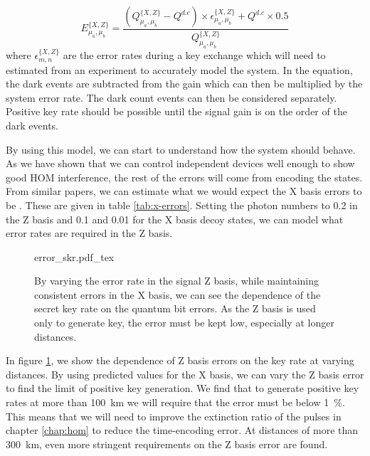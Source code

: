\begin{equation}
	E^{\{X,Z\}}_{\mu_a,\mu_b} = \frac{\left(Q^{\{X,Z\}}_{\mu_a,\mu_b} - Q^{d.c}\right) \times \epsilon^{\{X,Z\}}_{\mu_a,\mu_b} + Q^{d.c} \times 0.5}{Q^{\{X,Z\}}_{\mu_a,\mu_b}}
\end{equation}
where $\epsilon^{\{X,Z\}}_{m,n}$ are the error rates during a key exchange which will need to estimated from an experiment to accurately model the system. In the equation, the dark events are subtracted from the gain which can then be multiplied by the system error rate. The dark count events can then be considered separately. Positive key rate should be possible until the signal gain is on the order of the dark events.

By using this model, we can start to understand how the system should behave. As we have shown that we can control independent devices well enough to show good \ac{HOM} interference, the rest of the errors will come from encoding the states. From similar papers, we can estimate what we would expect the X basis errors to be \cite{Rubenok2013, Comandar2016}. These are given in table \ref{tab:x-errors}. Setting the photon numbers to \num{0.2} in the Z basis and \num{0.1} and \num{0.01} for the X basis decoy states, we can model what error rates are required in the Z basis.

\begin{figure}[tp]
	\centering
	\small
	\def\svgwidth{0.9\textwidth} 
	{error_skr.pdf_tex}
	\caption[Error dependence of secret key rate]{By varying the error rate in the signal Z basis, while maintaining consistent errors in the X basis, we can see the dependence of the secret key rate on the quantum bit errors. As the Z basis is used only to generate key, the error must be kept low, especially at longer distances.}
	\label{fig:skr_error_dependence}
\end{figure}

In figure \ref{fig:skr_error_dependence}, we show the dependence of Z basis errors on the key rate at varying distances. By using predicted values for the X basis, we can vary the Z basis error to find the limit of positive key generation. We find that to generate positive key rates at more than \SI{100}{\km} we will require that the error must be below \SI{1}{\percent}. This means that we will need to improve the extinction ratio of the pulses in chapter \ref{chap:hom} to reduce the time-encoding error. At distances of more than \SI{300}{\km}, even more stringent requirements on the Z basis error are found.

